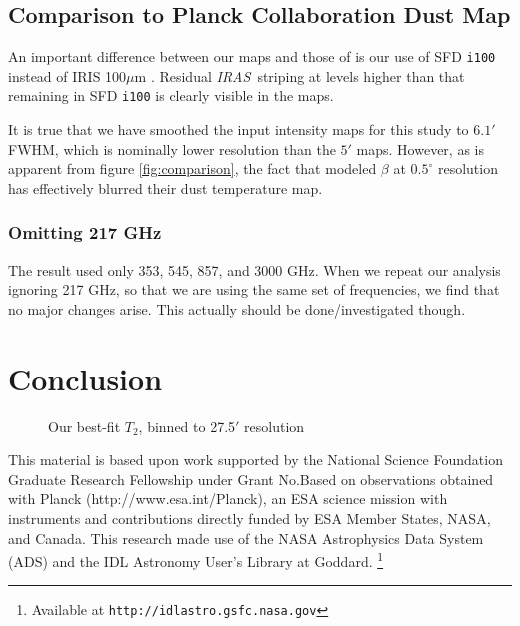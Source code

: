 \documentclass{emulateapj}
\newcommand{\IRAS}{{\it IRAS}}
\begin{document}
\subsection{Comparison to Planck Collaboration Dust Map}
An important difference between our maps and those of \cite{planckdust} is our 
use of SFD \verb|i100| instead of IRIS 100$\mu$m \citep{IRIS}. Residual 
\IRAS~striping at levels higher than that remaining in SFD \verb|i100| is 
clearly visible in the \cite{planckdust} maps.

It is true that we have smoothed the input intensity maps for this study 
to $6.1'$ FWHM, which is nominally lower resolution than the $5'$ 
\cite{planckdust} maps. However, as is apparent from figure 
\ref{fig:comparison}, the fact that \cite{planckdust} modeled $\beta$ at 
$0.5^{\circ}$ resolution has effectively blurred their dust temperature map.


\subsubsection{Omitting 217 GHz}
The \cite{planckdust} result used only 353, 545, 857, and 3000 GHz. When we 
repeat our analysis ignoring 217 GHz, so that we are using the same
set of frequencies, we find that no major changes arise. This actually
should be done/investigated though.

\section{Conclusion}
\label{sec:conclusion}

\begin{figure*} [ht]
\begin{center}
\caption{Our best-fit $T_2$, binned to 27.5$'$ resolution}
\end{center}
\end{figure*}

This material is based upon work supported by the National Science Foundation 
Graduate Research Fellowship under Grant No.Based on observations obtained with
 Planck (http://www.esa.int/Planck), an ESA science mission with instruments 
and contributions directly funded by ESA Member States, NASA, and Canada. This 
research made use of the NASA Astrophysics Data System (ADS) and the IDL 
Astronomy User's Library at Goddard. \footnote{Available at 
\texttt{http://idlastro.gsfc.nasa.gov}}



\end{document}
